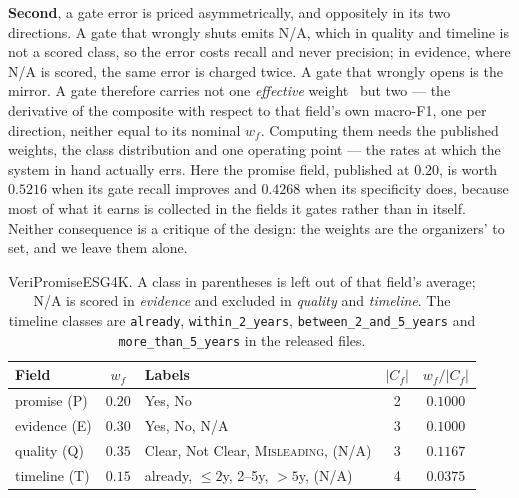 \textbf{Second}, a gate error is priced asymmetrically, and oppositely in its two directions. A
gate that wrongly shuts emits N/A, which in quality and timeline is not a scored class, so the
error costs recall and never precision; in evidence, where N/A is scored, the same error is
charged twice. A gate that wrongly opens is the mirror. A gate therefore carries not one
\emph{effective}
weight~\cite{wang1970differential} but two --- the derivative of the composite with respect to
that field's own macro-F1, one per direction, neither equal to its nominal $w_f$. Computing them
needs the published weights, the class distribution and one operating point --- the rates at
which the system in hand actually errs. Here the promise
field, published at $0.20$, is worth $0.5216$ when its gate recall improves and $0.4268$ when its
specificity does, because most of what it earns is collected in the fields it gates rather than
in itself. Neither consequence is a critique of the design: the weights are the organizers'
to set, and we leave them alone.

\begin{table}[t]
\caption{VeriPromiseESG4K. A class in parentheses is left out of that field's average;
N/A is scored in \emph{evidence} and excluded in \emph{quality} and \emph{timeline}. The
timeline classes are \texttt{already}, \texttt{within\_2\_years},
\texttt{between\_2\_and\_5\_years} and \texttt{more\_than\_5\_years} in the released files.}
\label{tab:schema}
\footnotesize
\setlength{\tabcolsep}{3pt}
\begin{tabular}{@{}lc>{\raggedright\arraybackslash}p{}cc@{}}
\toprule
Field & $w_f$ & Labels & $|C_f|$ & $w_f/|C_f|$ \\
\midrule
promise (P)  & $0.20$ & Yes, No & 2 & $0.1000$ \\
evidence (E) & $0.30$ & Yes, No, N/A & 3 & $0.1000$ \\
quality (Q)  & $0.35$ & Clear, Not Clear, \textsc{Misleading}, (N/A) & 3 & $\mathbf{0.1167}$ \\
timeline (T) & $0.15$ & already, ${\le}2$y, 2--5y, ${>}5$y, (N/A) & 4 & $0.0375$ \\
\bottomrule
\end{tabular}
\end{table}


